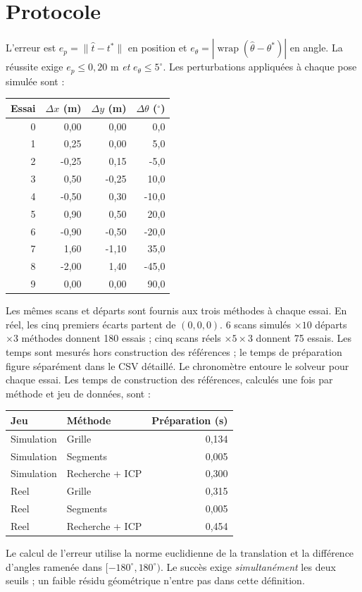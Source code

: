 \documentclass[11pt,a4paper]{article}
\begin{document}
\section{Protocole}
L'erreur est $e_p=\|\hat t-t^*\|$ en position et
$e_\theta=|\operatorname{wrap}(\hat\theta-\theta^*)|$ en angle.
La réussite exige $e_p\leq0{,}20$ m \emph{et} $e_\theta\leq5^\circ$.
Les perturbations appliquées à chaque pose simulée sont :
\begin{center}\small
\begin{tabular}{rrrr}\toprule Essai & $\Delta x$ (m) & $\Delta y$ (m) & $\Delta\theta$ ($^\circ$)\\
\midrule
0 & 0,00 & 0,00 & 0,0 \\
1 & 0,25 & 0,00 & 5,0 \\
2 & -0,25 & 0,15 & -5,0 \\
3 & 0,50 & -0,25 & 10,0 \\
4 & -0,50 & 0,30 & -10,0 \\
5 & 0,90 & 0,50 & 20,0 \\
6 & -0,90 & -0,50 & -20,0 \\
7 & 1,60 & -1,10 & 35,0 \\
8 & -2,00 & 1,40 & -45,0 \\
9 & 0,00 & 0,00 & 90,0 \\
\bottomrule\end{tabular}
\end{center}
Les mêmes scans et départs sont fournis aux trois méthodes à chaque essai.
En réel, les cinq premiers écarts partent de $(0,0,0)$.
6 scans simulés $\times10$ départs $\times3$ méthodes donnent
180 essais ; cinq scans réels $\times5\times3$ donnent
75 essais. Les temps sont mesurés hors construction des références ;
le temps de préparation figure séparément dans le CSV détaillé.
Le chronomètre entoure le solveur pour chaque essai. Les temps de
construction des références, calculés une fois par méthode et jeu de
données, sont :
\begin{center}\small
\begin{tabular}{llr}\toprule Jeu & Méthode & Préparation (s)\\\midrule
Simulation & Grille & 0,134 \\
Simulation & Segments & 0,005 \\
Simulation & Recherche + ICP & 0,300 \\
Reel & Grille & 0,315 \\
Reel & Segments & 0,005 \\
Reel & Recherche + ICP & 0,454 \\
\bottomrule\end{tabular}
\end{center}
Le calcul de l'erreur utilise la norme euclidienne de la translation et la
différence d'angles ramenée dans $[-180^\circ,180^\circ)$. Le succès exige
\emph{simultanément} les deux seuils ; un faible résidu géométrique n'entre
pas dans cette définition.
\end{document}
